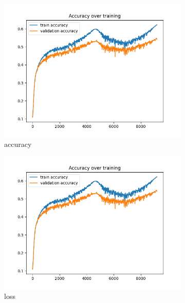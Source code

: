 \documentclass[a4paper]{article}
\begin{document}
\begin{figure}[h]
	\centering
	\begin{subfigure}{0.3\textwidth}
		\centering
		\includegraphics[width=\linewidth]{images/ex2_with_batch_acc.png}
		\caption{accuracy}
	\end{subfigure}
	\begin{subfigure}{0.3\textwidth}
		\centering
		\includegraphics[width=\linewidth]{images/ex2_with_batch_acc.png}
		\caption{loss}
	\end{subfigure}
	\begin{subfigure}{0.3\textwidth}
		\centering

\end{subfigure}
\end{figure}
\end{document}
